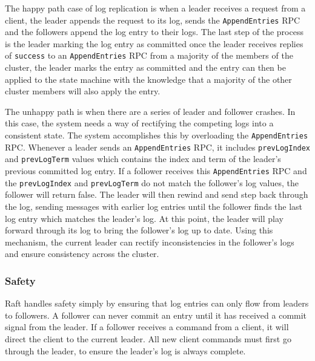 The happy path case of log replication is when a leader receives a request from a client, the leader appends the request to its log, sends the \texttt{AppendEntries} RPC and the followers append the log entry to their logs.
The last step of the process is the leader marking the log entry as committed once the leader receives replies of \texttt{success} to an \texttt{AppendEntries} RPC from a majority of the members of the cluster, the leader marks the entry as committed and the entry can then be applied to the state machine with the knowledge that a majority of the other cluster members will also apply the entry.

The unhappy path is when there are a series of leader and follower crashes.
In this case, the system needs a way of rectifying the competing logs into a consistent state.
The system accomplishes this by overloading the \texttt{AppendEntries} RPC.
Whenever a leader sends an \texttt{AppendEntries} RPC, it includes \texttt{prevLogIndex} and \texttt{prevLogTerm} values which contains the index and term of the leader's previous committed log entry.
If a follower receives this \texttt{AppendEntries} RPC and the \texttt{prevLogIndex} and \texttt{prevLogTerm} do not match the follower's log values, the follower will return false.
The leader will then rewind and send step back through the log, sending messages with earlier log entries until the follower finds the last log entry which matches the leader's log.  At this point, the leader will play forward through its log to bring the follower's log up to date.
Using this mechanism, the current leader can rectify inconsistencies in the follower's logs and ensure consistency across the cluster.


\subsubsection{Safety}

Raft handles safety simply by ensuring that log entries can only flow from leaders to followers.
A follower can never commit an entry until it has received a commit signal from the leader.  If a follower receives a command from a client, it will direct the client to the current leader.  All new client commands must first go through the leader, to ensure the leader's log is always complete.










\newpage





